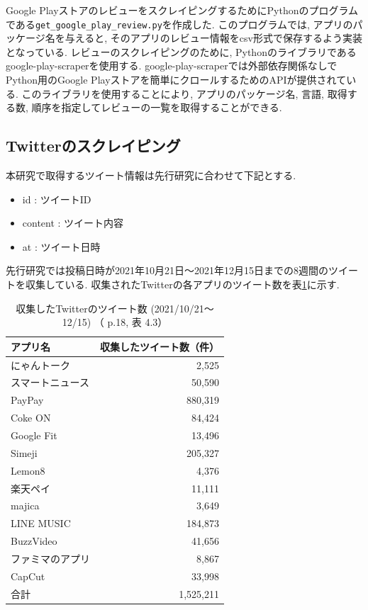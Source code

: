 Google PlayストアのレビューをスクレイピングするためにPythonのプログラムである\verb|get_google_play_review.py|を作成した. このプログラムでは, アプリのパッケージ名を与えると, そのアプリのレビュー情報をcsv形式で保存するよう実装となっている. 
レビューのスクレイピングのために, Pythonのライブラリであるgoogle-play-scraperを使用する. google-play-scraperでは外部依存関係なしでPython用のGoogle Playストアを簡単にクロールするためのAPIが提供されている\cite{google-play-scraper}. 
このライブラリを使用することにより, アプリのパッケージ名, 言語, 取得する数, 順序を指定してレビューの一覧を取得することができる. 


\subsection{Twitterのスクレイピング}
\label{sec:x}
本研究で取得するツイート情報は先行研究\cite{kawatsura}に合わせて下記とする. 
\begin{itemize}
 \item id : ツイートID
 \item content : ツイート内容
 \item at : ツイート日時
\end{itemize}

先行研究では投稿日時が2021年10月21日〜2021年12月15日までの8週間のツイートを収集している. 収集されたTwitterの各アプリのツイート数を表\ref{tb:rawtweetnum}に示す. 

\begin{table}[H]
  \caption{収集したTwitterのツイート数 (2021/10/21〜12/15) （ \cite{kawatsura} p.18, 表 4.3）}
  \label{tb:rawtweetnum}
  \begin{center}
  \begin{tabular}{l|r}
    \hline
    アプリ名&収集したツイート数（件）\\\hline\hline
    にゃんトーク&2,525\\\hline
    スマートニュース&50,590\\\hline
    PayPay&880,319\\\hline
    Coke ON&84,424\\\hline
    Google Fit&13,496\\\hline
    Simeji&205,327\\\hline
    Lemon8&4,376\\\hline
    楽天ペイ&11,111\\\hline
    majica&3,649\\\hline
    LINE MUSIC&184,873\\\hline
    BuzzVideo&41,656\\\hline
    ファミマのアプリ&8,867\\\hline
    CapCut&33,998\\\hline\hline
    合計&1,525,211
  \end{tabular}\end{center}
\end{table}

